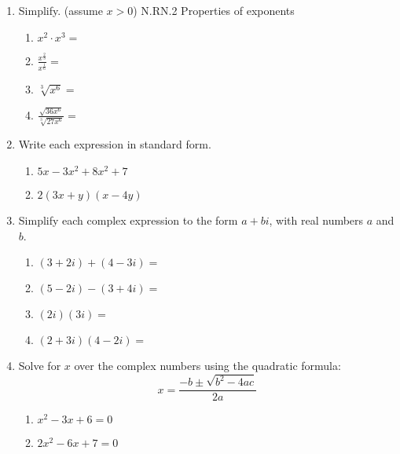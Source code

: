 \documentclass[12pt, twoside]{article}
\begin{document}
\begin{enumerate}[itemsep=0.5cm]
\item Simplify. (assume $x > 0$) \hfill N.RN.2 Properties of exponents
    \begin{multicols}{2}
    \begin{enumerate}[itemsep=1cm]
        \item $x^2 \cdot x^3 =$
        \item $\displaystyle \frac{x^{\frac{2}{3}}}{x^{\frac{1}{6}}} =$
        \item $\sqrt[3]{x^6} =$
        \item $\displaystyle \frac{\sqrt{36x^6}}{\sqrt[3]{27x^6}} = $
    \end{enumerate}
    \end{multicols}

\newpage
\item Write each expression in standard form.
    \begin{multicols}{2}
    \begin{enumerate}[itemsep=0.5cm]
        \item $5x-3x^2+8x^2+7$
        \item $2(3x+y)(x-4y)$
    \end{enumerate}
    \end{multicols} \vspace{4cm}

\item Simplify each complex expression to the form $a+bi$, with real numbers $a$ and $b$.
    \begin{multicols}{2}
    \begin{enumerate}[itemsep=0.5cm]
        \item $(3+2i) + (4-3i)=$
        \item $(5-2i) - (3+4i)=$
        \item $(2i)(3i)=$
        \item $(2+3i)(4-2i)=$
    \end{enumerate}
    \end{multicols}

\item Solve for $x$ over the complex numbers using the quadratic formula:
$$x = \frac{-b \pm \sqrt{b^2-4ac}}{2a}$$
    \begin{multicols}{2}
    \begin{enumerate}[itemsep=0.5cm]
        \item $x^2-3x+6=0$
        \item $2x^2-6x+7=0$
    \end{enumerate}
    \end{multicols} \vspace{4cm}


\end{enumerate}
\end{document}

